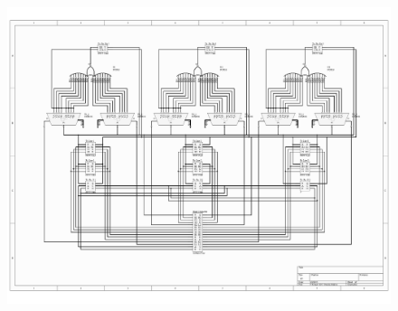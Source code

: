 \begin{figure}[h]
	\begin{center}
		\includegraphics[width=5.5in]{./images/eddie_image2.png}
		\caption{}
		\label{fig:eddie_fig2}
	\end{center}
\end{figure}









